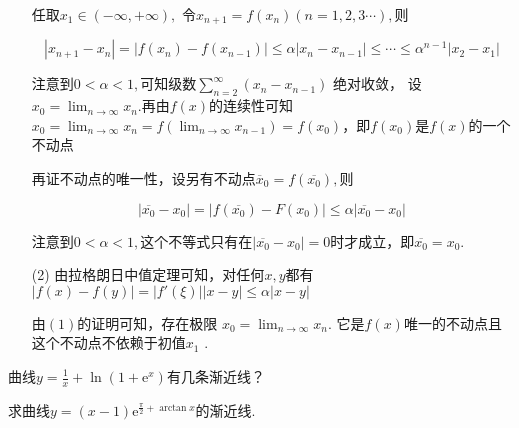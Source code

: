 \begin{xiti}
\begin{solution}
\begin{enumerate}
		任取$x_1\in(-\infty,+\infty),$
		令$x_{n+1}=f(x_n)(n=1,2,3\cdots ),$则
		
		\[|x_{n+1}-x_n|=|f(x_n)-f(x_{n-1})| \leq \alpha |x_n-x_{n-1}|\leq \cdots \leq \alpha ^{n-1}|x_2-x_1|\]
		
		注意到$0<\alpha<1,$可知级数$ \sum_{n=2}^{\infty}(x_n-x_{n-1})$
		绝对收敛，
		设$x_0=\lim_{n \rightarrow \infty}x_n.$再由$f(x)$的连续性可知
		$x_0=\lim_{n \rightarrow \infty}x_n=f(\lim_{n \rightarrow \infty}x_{n-1})=f(x_0)$，即$f(x_0)$是$f(x)$的一个不动点
		
		 再证不动点的唯一性，设另有不动点$\overline x_0=f(\overline{x_0}),$则
		
		\[|\overline{x_0}-x_0|=|f(\overline{x_0})-F(x_0)|\leq \alpha |\overline{x_0}-x_0|\]
		
		注意到$0<\alpha<1,$这个不等式只有在$|\overline{x_0}-x_0|=0$时才成立，即$\overline{x_0}=x_0.$
		\item[(2)] 由拉格朗日中值定理可知，对任何$x,y$都有
		$|f(x)-f(y)|=|f'(\xi)||x-y|\leq \alpha|x-y|$
		
		由$(1)$的证明可知，存在极限
		$x_0=\lim_{n \rightarrow \infty}x_n.$
		它是$f(x)$唯一的不动点且这个不动点不依赖于初值$x_1$
		.
	\end{enumerate}
	
\end{solution}
\item 曲线$y = \frac { 1 } { x } + \ln \left( 1 + \mathrm { e } ^ { x } \right)$有几条渐近线？
\item 求曲线$y = ( x - 1 ) \mathrm { e } ^ { \frac { \pi } { 2 } + \arctan x }$的渐近线.
\end{xiti}




